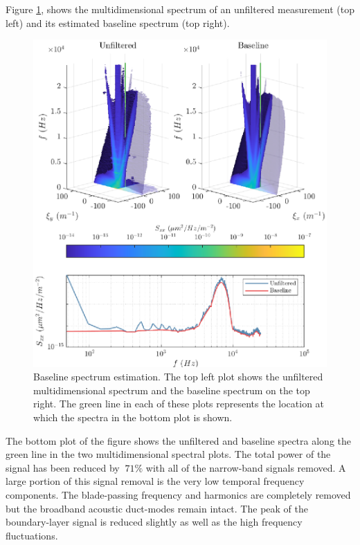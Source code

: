Figure \ref{fig:06_filter_baseline}, shows the multidimensional spectrum of an unfiltered measurement (top left) and its estimated baseline spectrum (top right).
\begin{figure}
  \centering
  \includegraphics{../matlab/06_single_sensor_filtering/filter_baseline.eps}
  \caption{Baseline spectrum estimation. The top left plot shows the unfiltered multidimensional spectrum and the baseline spectrum on the top right. The green line in each of these plots represents the location at which the spectra in the bottom plot is shown.}
  \label{fig:06_filter_baseline}
\end{figure}
The bottom plot of the figure shows the unfiltered and baseline spectra along the green line in the two multidimensional spectral plots.
The total power of the signal has been reduced by $~71\%$ with all of the narrow-band signals removed.
A large portion of this signal removal is the very low temporal frequency components.
The blade-passing frequency and harmonics are completely removed but the broadband acoustic duct-modes remain intact.
The peak of the boundary-layer signal is reduced slightly as well as the high frequency fluctuations.

